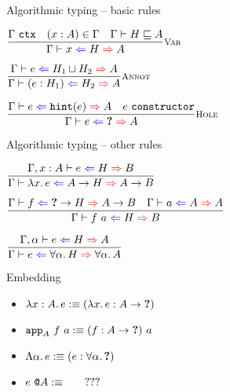 \documentclass{beamer}
\begin{document}
\begin{frame}{Algorithmic typing -- basic rules}

\begin{center}
  $\infrule[Var]{\tyctx{\Gamma} \quad \sidecond{(x : A) \in \Gamma} \quad \sidecond{\hintorderinctx{H}{A}}}{\hinting{x}{H}{A}}$

  \vspace{2em}

  $\infrule[Annot]{\hinting{e}{\combinehints{H_1}{H_2}}{A}}{\hinting{\annot{e}{H_1}}{H_2}{A}}$

  \vspace{2em}

  $\infrule[Hole]{\hinting{e}{\hintfor{e}}{A} \quad \sidecond{e\ \texttt{constructor}}}{\hinting{e}{\Hole}{A}}$
\end{center}

\end{frame}

\begin{frame}{Algorithmic typing -- other rules}

\begin{center}
  $\infrule{\fullhinting{\extend{\Gamma}{x}{A}}{e}{H}{B}}{\hinting{\fun{x}{e}}{\Fun{A}{H}}{\Fun{A}{B}}}$

  \vspace{2em}

  $\infrule{\hinting{f}{\Fun{\Hole}{H}}{\Fun{A}{B}} \quad \hinting{a}{A}{A}}{\hinting{\app{f}{a}}{H}{B}}$

  \vspace{2em}

  $\infrule{\fullhinting{\extendtype{\Gamma}{\alpha}}{e}{H}{A}}{\hinting{e}{\ForallT{\alpha}{H}}{\ForallT{\alpha}{A}}}$
\end{center}

\end{frame}

\begin{frame}{Embedding}

\begin{itemize}
  \item $\lambda x : A.\, e :\equiv (\lambda x.\, e : A \to \textbf{?})$ \\
  \item $\texttt{app}_{A}\ f\ a :\equiv (f : A \to \textbf{?})\ a$
  \item $\Lambda \alpha.\, e :\equiv (e : \forall \alpha.\, \textbf{?})$
  \item $e\ \texttt{@}A :\equiv \qquad ???$
\end{itemize}

\end{frame}
\end{document}
